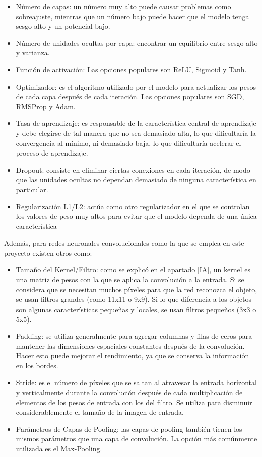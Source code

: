 \documentclass{report}
\begin{document}
\begin{itemize}
    \item Número de capas: un número muy alto puede causar problemas como sobreajuste, mientras que un número bajo puede hacer que el modelo tenga sesgo alto y un potencial bajo.
    \item Número de unidades ocultas por capa: encontrar un equilibrio entre sesgo alto y varianza.
    \item Función de activación: Las opciones populares son ReLU, Sigmoid y Tanh.
    \item Optimizador: es el algoritmo utilizado por el modelo para actualizar los pesos de cada capa después de cada iteración. Las opciones populares son SGD, RMSProp y Adam.
    \item Tasa de aprendizaje: es responsable de la característica central de aprendizaje y debe elegirse de tal manera que no sea demasiado alta, lo que dificultaría la convergencia al mínimo, ni demasiado baja, lo que dificultaría acelerar el proceso de aprendizaje.
    \item Dropout: consiste en eliminar ciertas conexiones en cada iteración, de modo que las unidades ocultas no dependan demasiado de ninguna característica en particular.
    \item Regularización L1/L2: actúa como otro regularizador en el que se controlan los valores de peso muy altos para evitar que el modelo dependa de una única característica
\end{itemize}

Además, para redes neuronales convolucionales como la que se emplea en este proyecto existen otros como:

\begin{itemize}
    \item Tamaño del Kernel/Filtro: como se explicó en el apartado \ref{IA}, un kernel es una matriz de pesos con la que se aplica la convolución a la entrada. Si se considera que se necesitan muchos píxeles para que la red reconozca el objeto, se usan filtros grandes (como 11x11 o 9x9). Si lo que diferencia a los objetos son algunas características pequeñas y locales, se usan filtros pequeños (3x3 o 5x5).
    \item Padding: se utiliza generalmente para agregar columnas y filas de ceros para mantener las dimensiones espaciales constantes después de la convolución. Hacer esto puede mejorar el rendimiento, ya que se conserva la información en los bordes.
    \item Stride: es el número de píxeles que se saltan al atravesar la entrada horizontal y verticalmente durante la convolución después de cada multiplicación de elementos de los pesos de entrada con los del filtro. Se utiliza para disminuir considerablemente el tamaño de la imagen de entrada.
    \item Parámetros de Capas de Pooling: las capas de pooling también tienen los mismos parámetros que una capa de convolución. La opción más comúnmente utilizada es el Max-Pooling.
\end{itemize}
\end{document}
